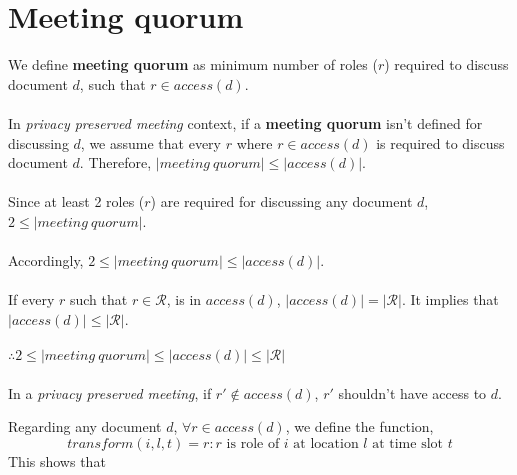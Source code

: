 \documentclass{article}
\begin{document}
\section{Meeting quorum}
\noindent
We define \textbf{meeting quorum} as minimum number of roles ($r$) required to discuss document $d$, such that $r \in access(d)$. \\ \\
In \textit{privacy preserved meeting} context, if a \textbf{meeting quorum} isn't defined for discussing $d$, we assume that every $r$ where $r \in access(d) $ is required to discuss document $d$. Therefore, $|meeting\ quorum| \leq |access(d)|$.\\ \\
Since at least 2 roles ($r$) are required for discussing any document $d$, $2 \leq |meeting\ quorum|$. \\ \\
Accordingly, $2 \leq |meeting\ quorum| \leq |access(d)|$. \\ \\
If every $r$ such that $r \in \mathcal{R}$, is in $access(d)$, $|access(d)| = |\mathcal{R}|$. It implies that $|access(d)| \leq |\mathcal{R}|$. \\ \\
$\therefore 2 \leq |meeting\ quorum| \leq |access(d)| \leq |\mathcal{R}|$ \\ \\
In a \textit{privacy preserved meeting}, if $r' \notin access(d)$, $r'$ shouldn't have access to $d$.

Regarding any document $d$, $\forall r \in access(d)$, we define the function, 
    \[ transform(i, l, t) = r : r \text{ is role of } i \text{ at location } l \text{ at time slot } t \]
This shows that
\end{document}
